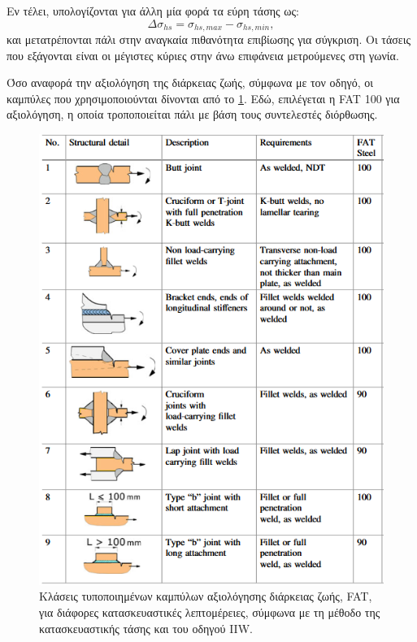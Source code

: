 \documentclass{article}
\begin{document}
Εν τέλει, υπολογίζονται για άλλη μία φορά τα εύρη τάσης ως:
\begin{equation}
    \Delta \sigma_{hs} = \sigma_{hs,max} - \sigma_{hs,min},
\end{equation}
και μετατρέπονται πάλι στην αναγκαία πιθανότητα επιβίωσης για σύγκριση. Οι τάσεις που εξάγονται είναι οι μέγιστες κύριες στην άνω επιφάνεια μετρούμενες στη γωνία.
\par Όσο αναφορά την αξιολόγηση της διάρκειας ζωής, σύμφωνα με τον οδηγό, οι καμπύλες που χρησιμοποιούνται δίνονται από το \ref{fig:faths}. Εδώ, επιλέγεται η FAT 100 για αξιολόγηση, η οποία τροποποιείται πάλι με βάση τους συντελεστές διόρθωσης.
\begin{figure}[H]
    \centering
    \includegraphics[width = 0.45\linewidth]{media/hsfat.png}
    \caption{Κλάσεις τυποποιημένων καμπύλων αξιολόγησης διάρκειας ζωής, FAT, για διάφορες κατασκευαστικές λεπτομέρειες, σύμφωνα με τη μέθοδο της κατασκευαστικής τάσης και του οδηγού IIW.}
    \label{fig:faths}
\end{figure}
\end{document}
